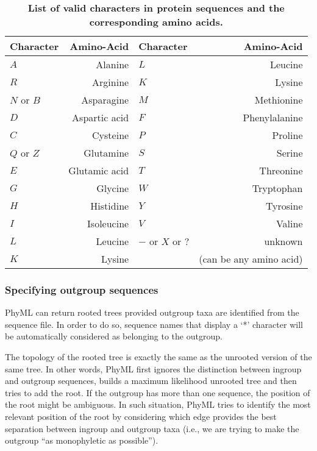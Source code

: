 \documentclass[a4paper,12pt]{article}
\begin{document}
\begin{table}
\begin{center}
\begin{tabular}{lr|lr}
\hline
Character & Amino-Acid & Character & Amino-Acid \\
\hline
$A$       & Alanine &         $L$       & Leucine \\             
$R$       & Arginine &        $K$       & Lysine \\              
$N$ or $B$& Asparagine &      $M$       & Methionine \\          
$D$       & Aspartic acid &   $F$       & Phenylalanine \\       
$C$       & Cysteine &        $P$       & Proline \\             
$Q$ or $Z$& Glutamine &       $S$       & Serine \\              
$E$       & Glutamic acid &   $T$       & Threonine \\           
$G$       & Glycine &         $W$       & Tryptophan \\          
$H$       & Histidine &       $Y$       & Tyrosine \\            
$I$       & Isoleucine &      $V$       & Valine \\              
$L$       & Leucine &         $-$ or $X$ or $?$ & unknown \\     
$K$       & Lysine &          & (can be any amino acid) \\       
\hline
\end{tabular}
\end{center}
\caption{{\bf List of valid characters in protein sequences and the corresponding amino acids.}}\label{tab:ambigu_aa}
\end{table}

\subsubsection{Specifying outgroup sequences}\label{sec:outgroupspecify}

PhyML can return rooted trees provided outgroup taxa are identified from the sequence file. In
order to do so, sequence names that display a `*' character will be automatically considered as
belonging to the outgroup. 

The topology of  the rooted tree is  exactly the same as the  unrooted version of the  same tree. In
other words,  PhyML first ignores the distinction  between ingroup and outgroup  sequences, builds a
maximum likelihood unrooted tree  and then tries to add the root. If the  outgroup has more than one
sequence, the position  of the root might be  ambiguous. In such situation, PhyML  tries to identify
the  most relevant  position of  the root  by considering  which edge  provides the  best separation
between ingroup  and outgroup taxa (i.e.,  we are trying to  make the outgroup  ``as monophyletic as
possible'').
\end{document}
